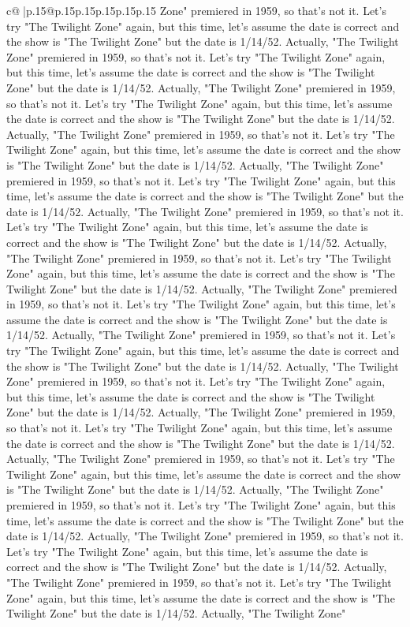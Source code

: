 \documentclass{article}
\begin{document}
{\begin{supertabular}{c@{$\;$}|p{.15\linewidth}@{}p{.15\linewidth}p{.15\linewidth}p{.15\linewidth}p{.15\linewidth}p{.15\linewidth}}
{{{Zone" premiered in 1959, so that's not it. Let's try "The Twilight Zone" again, but this time, let's assume the date is correct and the show is "The Twilight Zone" but the date is 1/14/52. Actually, "The Twilight Zone" premiered in 1959, so that's not it. Let's try "The Twilight Zone" again, but this time, let's assume the date is correct and the show is "The Twilight Zone" but the date is 1/14/52. Actually, "The Twilight Zone" premiered in 1959, so that's not it. Let's try "The Twilight Zone" again, but this time, let's assume the date is correct and the show is "The Twilight Zone" but the date is 1/14/52. Actually, "The Twilight Zone" premiered in 1959, so that's not it. Let's try "The Twilight Zone" again, but this time, let's assume the date is correct and the show is "The Twilight Zone" but the date is 1/14/52. Actually, "The Twilight Zone" premiered in 1959, so that's not it. Let's try "The Twilight Zone" again, but this time, let's assume the date is correct and the show is "The Twilight Zone" but the date is 1/14/52. Actually, "The Twilight Zone" premiered in 1959, so that's not it. Let's try "The Twilight Zone" again, but this time, let's assume the date is correct and the show is "The Twilight Zone" but the date is 1/14/52. Actually, "The Twilight Zone" premiered in 1959, so that's not it. Let's try "The Twilight Zone" again, but this time, let's assume the date is correct and the show is "The Twilight Zone" but the date is 1/14/52. Actually, "The Twilight Zone" premiered in 1959, so that's not it. Let's try "The Twilight Zone" again, but this time, let's assume the date is correct and the show is "The Twilight Zone" but the date is 1/14/52. Actually, "The Twilight Zone" premiered in 1959, so that's not it. Let's try "The Twilight Zone" again, but this time, let's assume the date is correct and the show is "The Twilight Zone" but the date is 1/14/52. Actually, "The Twilight Zone" premiered in 1959, so that's not it. Let's try "The Twilight Zone" again, but this time, let's assume the date is correct and the show is "The Twilight Zone" but the date is 1/14/52. Actually, "The Twilight Zone" premiered in 1959, so that's not it. Let's try "The Twilight Zone" again, but this time, let's assume the date is correct and the show is "The Twilight Zone" but the date is 1/14/52. Actually, "The Twilight Zone" premiered in 1959, so that's not it. Let's try "The Twilight Zone" again, but this time, let's assume the date is correct and the show is "The Twilight Zone" but the date is 1/14/52. Actually, "The Twilight Zone" premiered in 1959, so that's not it. Let's try "The Twilight Zone" again, but this time, let's assume the date is correct and the show is "The Twilight Zone" but the date is 1/14/52. Actually, "The Twilight Zone" premiered in 1959, so that's not it. Let's try "The Twilight Zone" again, but this time, let's assume the date is correct and the show is "The Twilight Zone" but the date is 1/14/52. Actually, "The Twilight Zone" premiered in 1959, so that's not it. Let's try "The Twilight Zone" again, but this time, let's assume the date is correct and the show is "The Twilight Zone" but the date is 1/14/52. Actually, "The Twilight Zone" }}}
\end{supertabular}}
\end{document}
